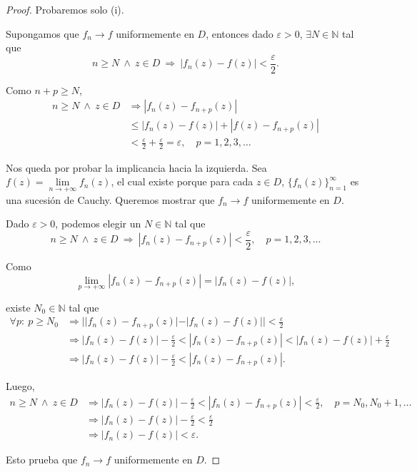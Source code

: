 \begin{proof}
Probaremos solo (i). 

Supongamos que $f_n \to f$ uniformemente en $D$, entonces dado $\varepsilon > 0$, $\exists N\in \mathbb{N} $ tal que
$$n \geq N ~\wedge~  z \in D ~\Rightarrow~ |f_n(z) - f(z)| < \frac{\varepsilon}{2}.$$

Como $n+p \geq N$, 
\begin{align*}
n \geq N ~\wedge~  z \in D &\Rightarrow |f_n(z) - f_{n+p}(z)| \\
&\leq |f_n(z) - f(z)| + |f(z) - f_{n+p}(z)| \\
&< \frac{\varepsilon}{2} + \frac{\varepsilon}{2} = \varepsilon, \quad p = 1,2,3, \dots
\end{align*}

Nos queda por probar la implicancia hacia la izquierda. Sea $f(z) = \lim\limits_{n\to + \infty} f_n(z)$, el cual existe porque para cada $z \in D$, $\{f_n(z)\}_{n=1}^{\infty}$ es una sucesión de Cauchy. Queremos mostrar que $f_n \to f$ uniformemente en $D$.

Dado $\varepsilon > 0$, podemos elegir un $N \in \mathbb{N}$ tal que 
$$n \geq N ~\wedge~  z \in D ~\Rightarrow~ |f_n(z) - f_{n+p}(z)| < \frac{\varepsilon}{2}, \quad p = 1,2,3, \dots$$

Como
$$\lim_{p \to + \infty} |f_n(z) - f_{n+p}(z)| = |f_n(z) - f(z)|,$$

existe $N_0 \in \mathbb{N}$ tal que
\begin{align*}
    \forall p: ~ p \geq N_0 &\Rightarrow  ||f_n(z) - f_{n+p}(z)| - |f_n(z) - f(z)|| < \frac{\varepsilon}{2} \\
    &\Rightarrow |f_n(z) - f(z)| - \frac{\varepsilon}{2} < |f_n(z) - f_{n+p}(z)| < |f_n(z) - f(z)| + \frac{\varepsilon}{2} \\
    & \Rightarrow |f_n(z) - f(z)| - \frac{\varepsilon}{2} < |f_n(z) - f_{n+p}(z)|.
\end{align*}

Luego,
\begin{align*}
n \geq N ~\wedge~  z \in D &\Rightarrow |f_n(z) - f(z)| - \frac{\varepsilon}{2} < |f_n(z) - f_{n+p}(z)| < \frac{\varepsilon}{2}, \quad p = N_0, N_0 +1,\dots \\
&\Rightarrow |f_n(z) - f(z)| - \frac{\varepsilon}{2} < \frac{\varepsilon}{2} \\
&\Rightarrow |f_n(z) - f(z)| < \varepsilon.
\end{align*}

Esto prueba que $f_n \to f$ uniformemente en $D$.

\end{proof}

